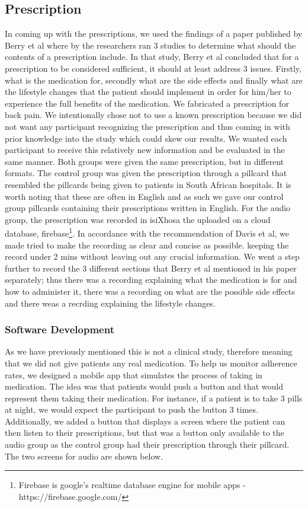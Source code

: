 \subsection{Prescription}
In coming up with the prescriptions, we used the findings of a paper published by Berry et al \cite{Berry} where by the researchers ran 3 studies to determine what should the contents of a prescription include. In that study, Berry et al concluded that for a prescription to be considered sufficient, it should at least address 3 issues. Firstly, what is the medication for, secondly what are the side effects and finally what are the lifestyle changes that the patient should implement in order for him/her to experience the full benefits of the medication.
We fabricated a prescription for back pain. We intentionally chose not to use a known prescription because we did not want any participant recognizing the prescription and thus coming in with prior knowledge into the study which could skew our results. We wanted each participant to receive this relatively new information and be evaluated in the same manner. Both groups were given the same prescription, but in different formats. The control group was given the prescription through a pillcard that resembled the pillcards being given to patients in South African hospitals. It is worth noting that these are often in English and as such we gave our control group pillcards containing their prescriptions written in English. For the audio group, the prescription was recorded in isiXhosa the uploaded on a cloud database, firebase\footnote{Firebase is google's realtime database engine for mobile apps - https://firebase.google.com/}. In accordance with the recommendation of Davis et al, we made tried to make the recording as clear and concise as possible. keeping the record under 2 mins without leaving out any crucial information. We went a step further to record the 3 different sections that Berry et al mentioned in his paper separately; thus there was a recording explaining what the medication is for and how to administer it, there was a recording on what are the possible side effects and there weas a recrding explaining the lifestyle changes.

\subsubsection{Software Development}
As we have previously mentioned this is not a clinical study, therefore meaning that we did not give patients any real medication. To help us monitor adherence rates, we designed a mobile app that simulates the process of taking in medication. The idea was that patients would push a button and that would represent them taking their medication. For instance, if a patient is to take 3 pills at night, we would expect the participant to push the button 3 times. Additionally, we added a button that displays a screen where the patient can then listen to their prescriptions, but that was a button only available to the audio group as the control group had their prescription through their pillcard. The two screens for audio are shown below.

